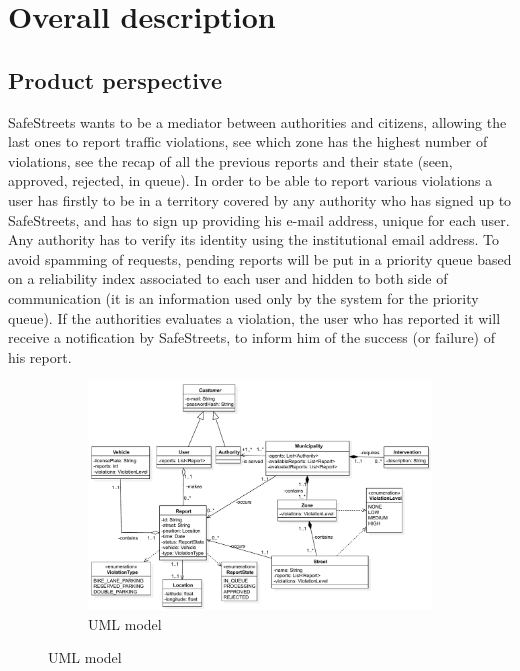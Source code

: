 \documentclass[12pt,a4paper]{report}
\begin{document}

\chapter{Overall description}
	\section{Product perspective}
		SafeStreets wants to be a mediator between authorities and citizens, allowing the last ones to report traffic violations, see which zone has the highest number of violations, see the recap of all the previous reports and their state
		(seen, approved, rejected, in queue). In order to be able to report various violations a user has firstly to be in a
		territory covered by any authority who has signed up to SafeStreets, and has to sign up providing his e-mail address, unique for each user. Any authority has to verify its identity using the institutional email address.
		To avoid spamming of requests, pending reports will be put in a priority queue based 
		on a reliability index associated to each user and hidden to both side of communication (it is an information used only by 
		the system for the priority queue). If the authorities evaluates a violation, the user who has reported it
		will receive a notification by SafeStreets, to inform him of the success (or failure) of his report. 
		\begin{figure}[H]
			\begin{subfigure}{\textwidth}
				\includegraphics[scale = 0.65, center]{uml}
				\caption{UML model}
				\label{UML model }
			\end{subfigure}
		\end{figure}
\end{document}
